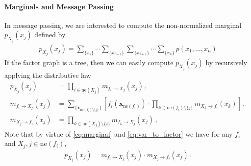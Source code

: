 \documentclass[a4paper]{article}
\newcommand{\bs}[1]{\boldsymbol{#1}}
\newcommand{\neighbours}[1]{{\mathrm{ne} \left( {#1} \right)}}
\theoremstyle{definition}
\begin{document}
\paragraph{Marginals and Message Passing} In message passing, we are interested to compute the non-normalized marginal $p_{X_j}(x_j)$ defined by
\begin{align}
    p_{X_j}(x_j) = \sum_{\{x_1\}}\cdots\sum_{\{x_{j-1}\}}\sum_{\{x_{j+1}\}}\cdots\sum_{\{x_n\}} p(x_1,\ldots,x_n) \label{eq:marginal_def}
\end{align}
If the factor graph is a tree, then we can easily compute $p_{X_j}(x_j)$ by recursively applying the distributive law
\begin{align}
    p_{X_j} (x_j) &= \prod_{i \in \neighbours{X_j}} m_{f_i \to X_j}(x_j) \,, \label{eq:marginal} \\
    m_{f_i \to X_j}(x_j) &= \sum_{\{\bs{x}_{\neighbours{f_i} \setminus \{j\}}\}} \left[ f_i(\bs{x}_{\neighbours{f_i}}) \cdot \prod_{k \in \neighbours{f_i} \setminus \{j\}} m_{X_k \to f_i}(x_k) \right] \,, \label{eq:factor_to_var} \\
    m_{X_j \to f_i}(x_j) &= \prod_{k \in \neighbours{X_j} \setminus \{i\}} m_{f_k \to X_j}(x_j) \,, \label{eq:var_to_factor}
\end{align}
Note that by virtue of \eqref{eq:marginal} and \eqref{eq:var_to_factor} we have for any $f_i$ and $X_j, j\in \neighbours{f_i}$, 
\begin{align}
    p_{X_j}(x_j) = m_{f_i \to X_j}(x_j) \cdot m_{X_j \to f_i}(x_j)\,. \label{eq:marginal_factor}
\end{align}
\end{document}
